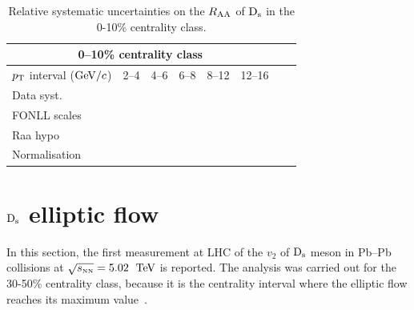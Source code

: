 \begin{table}[!h]
\centering
\begin{tabular}{|l|l|l|c|c|c|c|c|}
\hline
\multicolumn{6}{|c|}{0--10\% centrality class}       \\                                                                                                                                                                                                                                               \hline
$p_{\rm T}$ interval ($\mathrm{GeV}/c$)           & 2--4        &    4--6          & 6--8      &   8--12            & 12--16                  \\ 
Data syst. & & & & & \\
FONLL scales & & & & & \\
Raa hypo & & & & & \\
Normalisation & & & & & \\
\hline
\end{tabular}
\caption{Relative systematic uncertainties on the $R_{\rm AA}$ of ${\rm D_s}$ in the 0-10\% centrality class.}
\label{tab:sysunc_yieldtable}
\end{table}

\section{${\rm D_s}$ elliptic flow}
In this section, the first measurement at LHC of the $v_2$ of 
${\rm D_s}$ meson in Pb--Pb collisions at 
$\sqrt{s_{\rm \scriptscriptstyle NN}} = 5.02$~$\mathrm{TeV}$ is reported. The analysis was carried 
out for the 30-50\% centrality class, because it is the centrality
interval where the elliptic flow reaches its maximum value~\cite{Adam:2016izf}. 

